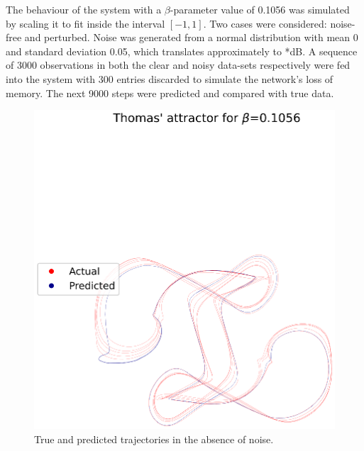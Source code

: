 \documentclass[a4paper,12pt,twoside]{report}
\begin{document}
The behaviour of the system with a $\beta$-parameter value of 0.1056 was simulated by scaling it to fit inside the interval $[-1,1]$. Two cases were considered: noise-free and perturbed. Noise was generated from a normal distribution with mean 0 and standard deviation 0.05, which translates approximately to *dB.
 A sequence of 3000 observations in both the clear and noisy data-sets respectively were fed into the system with 300 entries discarded to simulate the network's loss of memory. The next 9000 steps were predicted and compared with true data.

\begin{figure}[ht]
  \centering
    \centering
    \includegraphics[width=\linewidth]{Thomas_nonoise.eps}
    \caption*{True and predicted trajectories in the absence of noise.}
  \endminipage\hfill
    \centering

\end{figure}
\end{document}
